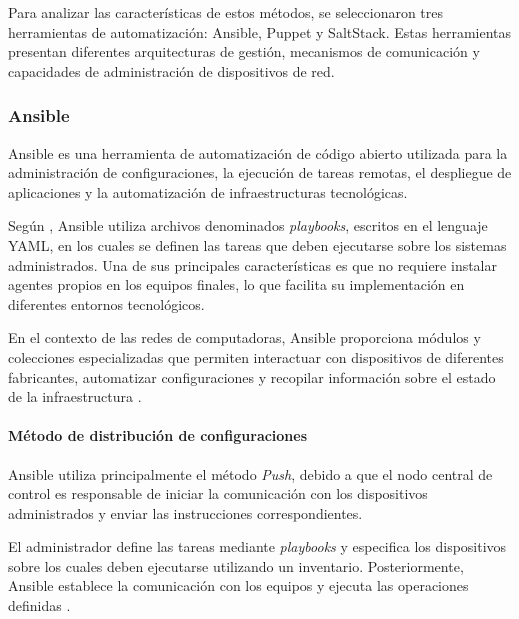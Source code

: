 \documentclass[12pt,a4paper]{article}
\begin{document}
Para analizar las características de estos métodos, se seleccionaron
tres herramientas de automatización: Ansible, Puppet y SaltStack.
Estas herramientas presentan diferentes arquitecturas de gestión,
mecanismos de comunicación y capacidades de administración de
dispositivos de red.



\subsubsection{Ansible}
\label{sec:ansible}

Ansible es una herramienta de automatización de código abierto
utilizada para la administración de configuraciones, la ejecución
de tareas remotas, el despliegue de aplicaciones y la automatización
de infraestructuras tecnológicas.

Según \textcite{geerling2020ansible}, Ansible utiliza archivos
denominados \textit{playbooks}, escritos en el lenguaje YAML, en los
cuales se definen las tareas que deben ejecutarse sobre los sistemas
administrados. Una de sus principales características es que no
requiere instalar agentes propios en los equipos finales, lo que
facilita su implementación en diferentes entornos tecnológicos.

En el contexto de las redes de computadoras, Ansible proporciona
módulos y colecciones especializadas que permiten interactuar con
dispositivos de diferentes fabricantes, automatizar configuraciones
y recopilar información sobre el estado de la infraestructura
\parencite{redhat_ansible_network}.


\paragraph{Método de distribución de configuraciones}

Ansible utiliza principalmente el método \textit{Push}, debido a
que el nodo central de control es responsable de iniciar la
comunicación con los dispositivos administrados y enviar las
instrucciones correspondientes.

El administrador define las tareas mediante \textit{playbooks}
y especifica los dispositivos sobre los cuales deben ejecutarse
utilizando un inventario. Posteriormente, Ansible establece la
comunicación con los equipos y ejecuta las operaciones definidas
\parencite{geerling2020ansible}.
\end{document}
